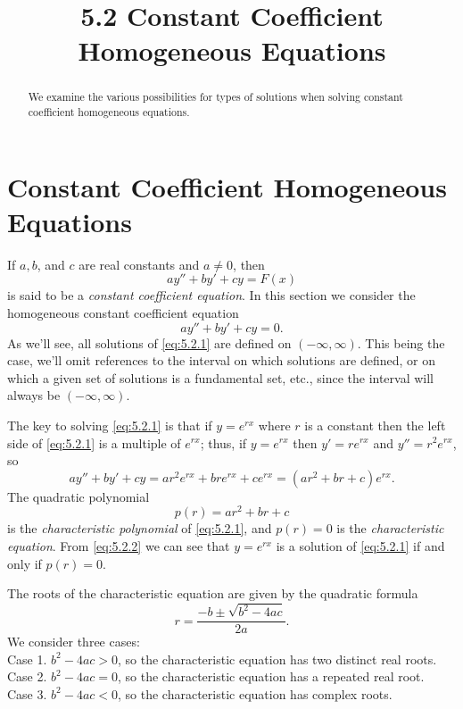 \documentclass{ximera}
\title{5.2 Constant Coefficient Homogeneous Equations}
\begin{document}
 
\begin{abstract}
We examine the various possibilities for types of solutions when solving constant coefficient homogeneous equations.
\end{abstract}
 
\maketitle
 
\section*{Constant Coefficient Homogeneous Equations}
 
If $a,b$, and $c$ are real constants and $a\neq 0$, then
$$
ay''+by'+cy=F(x)
$$
 is said to be a \textit{constant coefficient
 equation}.
In this section we  consider the homogeneous constant
coefficient equation
\begin{equation} \label{eq:5.2.1}
ay''+by'+cy=0.
\end{equation}
As we'll see, all solutions of \eqref{eq:5.2.1} are defined on
$(-\infty,\infty)$.  This being the case, we'll omit references to the
interval on which solutions are defined, or on which a given set of
solutions is a fundamental set, etc., since the interval will always
be $(-\infty,\infty)$.
 
The key to solving \eqref{eq:5.2.1} is  that if
 $y=e^{rx}$ where $r$ is a constant  then the left side of
\eqref{eq:5.2.1} is a  multiple of $e^{rx}$;   thus, if $y=e^{rx}$
 then $y'=re^{rx}$ and $y''=r^2e^{rx}$, so
\begin{equation} \label{eq:5.2.2}
ay''+by'+cy=ar^2e^{rx}+bre^{rx}+ce^{rx}=(ar^2+br+c)e^{rx}.
\end{equation}
The quadratic polynomial
$$
p(r)=ar^2+br+c
$$
is  the \textit{characteristic polynomial} of \eqref{eq:5.2.1}, and
$p(r)=0$
is the \textit{characteristic equation}.
From \eqref{eq:5.2.2} we can see that $y=e^{rx}$ is a solution of
\eqref{eq:5.2.1}  if and only if $p(r)=0$.
 
The roots of the characteristic equation are given by the quadratic
formula
\begin{equation} \label{eq:5.2.3}
r=\frac{-b\pm\sqrt{b^2-4ac}}{2a}.
\end{equation}
We consider three cases:\\
Case 1. $b^2-4ac>0$, so the characteristic equation has two
distinct real roots.\\
Case 2. $b^2-4ac=0$, so the characteristic equation has a
repeated real root.\\
Case 3. $b^2-4ac<0$, so the characteristic equation has
complex roots.
 
\end{document}
